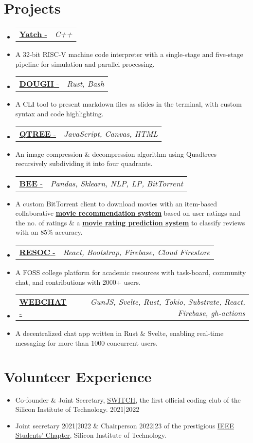 \documentclass[letterpaper,10pt]{article}
\makeatletter
\newcommand{\resumeItem}[1]{
  \item\small{
    {#1 \vspace{-2pt}}
  }
}
\newcommand{\resumeProjectHeading}[2]{
    \item
    \begin{tabular*}{0.97\textwidth}{l@{\extracolsep{\fill}}r}
      \small#1 & \textit{\small #2} \\
    \end{tabular*}\vspace{-4 pt}
}
\newcommand{\resumeSubItem}[1]{\resumeItem{#1}\vspace{-4pt}}
\newcommand{\resumeSubHeadingListStart}{\begin{itemize}[leftmargin=0.15in, label={}]}
\newcommand{\resumeSubHeadingListEnd}{\end{itemize}}
\makeatother
\begin{document}


\section{Projects}
  \resumeSubHeadingListStart
\resumeProjectHeading
  {\href{https://github.com/fuzzymfx/yatch}{\textbf{Yatch} - \faIcon{link}}}{C++}
    \resumeSubItem
      {A 32-bit RISC-V machine code interpreter with a single-stage and five-stage pipeline for simulation and parallel processing.}

  \resumeProjectHeading
    {\href{https://github.com/fuzzymfx/dough}{\textbf{DOUGH} - \faIcon{link}}}{Rust, Bash}
    \resumeSubItem
      {A CLI tool to present markdown files as slides in the terminal, with custom syntax and code highlighting.}
  \resumeProjectHeading
    {\href{https://anubhavp.dev/blog/qtree.html}{\textbf{QTREE} - \faIcon{link}}}{JavaScript, Canvas, HTML}
    \resumeSubItem
      {An image compression \& decompression algorithm using Quadtrees recursively subdividing it into four quadrants. }
  \resumeProjectHeading
    {\href{https://github.com/fuzzymfx/b}{{\textbf{BEE} - \faIcon{link} }}}{Pandas, Sklearn, NLP, LP, BitTorrent}
    \resumeSubItem
      {A custom BitTorrent client to download movies with an item-based collaborative \href{https://github.com/fuzzymfx/Movie-recommendation}{\underline{\textbf{ movie recommendation system}}} based on user ratings and the no. of ratings \& a \href{https://github.com/fuzzymfx/Movie-rating-prediction}{\underline{\textbf{movie rating prediction system}}} to classify reviews with an 85\% accuracy.}
  \resumeProjectHeading
    {\href{https://github.com/fuzzymfx/resoc}{\textbf{RESOC} - \faIcon{link} }}{React, Bootstrap, Firebase, Cloud Firestore}
    \resumeSubItem
      {A FOSS college platform for academic resources with task-board, community chat, and contributions with 2000+ users.}
    \resumeProjectHeading
    {\href{https://github.com/fuzzymfx/w3bchat-dapp}{\textbf{WEBCHAT} - \faIcon{link}}}{GunJS, Svelte, Rust, Tokio, Substrate, React, Firebase, gh-actions}
    \resumeSubItem
      {A decentralized chat app written in Rust \& Svelte, enabling real-time messaging for more than 1000 concurrent users.}
  \resumeSubHeadingListEnd

%

\section{Volunteer Experience}
  \resumeSubHeadingListStart
    \resumeSubItem
      {Co-founder \& Joint Secretary, \href{https://www.linkedin.com/company/switch-sit/}{\underline{SWITCH}}, the first official coding club of the Silicon Institute of Technology. 2021|2022}
    \resumeSubItem
      {Joint secretary 2021|2022 \& Chairperson 2022|23 of the prestigious \href{https://www.instagram.com/ieeesitbbsr/}{\underline{IEEE Students’ Chapter}}, Silicon Institute of Technology.}
  \resumeSubHeadingListEnd

\end{document}
